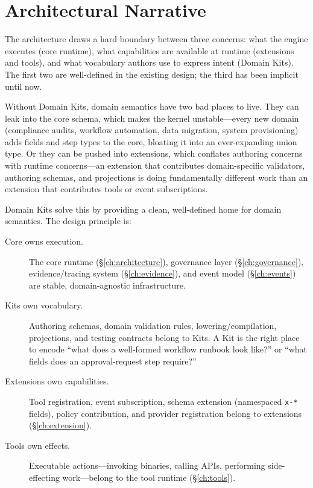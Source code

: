 \section{Architectural Narrative}
\label{sec:kit-narrative}

The architecture draws a hard boundary between three concerns: what the
engine executes (core runtime), what capabilities are available at runtime
(extensions and tools), and what vocabulary authors use to express intent
(Domain Kits).  The first two are well-defined in the existing design; the
third has been implicit until now.

Without Domain Kits, domain semantics have two bad places to live.  They can
leak into the core schema, which makes the kernel unstable---every new domain
(compliance audits, workflow automation, data migration, system provisioning)
adds fields and step types to the core, bloating it into an ever-expanding
union type.  Or they can be pushed into extensions, which conflates authoring
concerns with runtime concerns---an extension that contributes domain-specific
validators, authoring schemas, and projections is doing fundamentally different
work than an extension that contributes tools or event subscriptions.

Domain Kits solve this by providing a clean, well-defined home for domain
semantics.  The design principle is:

\begin{description}
  \item[Core owns execution.] The core runtime
    (\S\ref{ch:architecture}), governance layer (\S\ref{ch:governance}),
    evidence/tracing system (\S\ref{ch:evidence}), and event model
    (\S\ref{ch:events}) are stable, domain-agnostic infrastructure.

  \item[Kits own vocabulary.] Authoring schemas, domain validation rules,
    lowering/compilation, projections, and testing contracts belong to Kits.  A
    Kit is the right place to encode ``what does a well-formed workflow runbook
    look like?'' or ``what fields does an approval-request step require?''

  \item[Extensions own capabilities.] Tool registration, event subscription,
    schema extension (namespaced \texttt{x-*} fields), policy contribution, and
    provider registration belong to extensions (\S\ref{ch:extension}).

  \item[Tools own effects.] Executable actions---invoking binaries, calling
    APIs, performing side-effecting work---belong to the tool runtime
    (\S\ref{ch:tools}).
\end{description}


